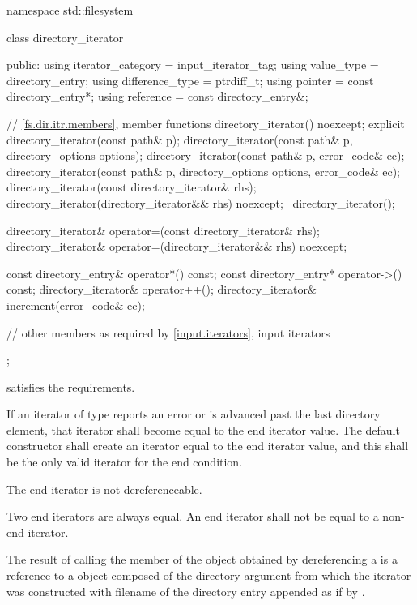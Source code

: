 \begin{codeblock}
namespace std::filesystem {
  class directory_iterator {
  public:
    using iterator_category = input_iterator_tag;
    using value_type        = directory_entry;
    using difference_type   = ptrdiff_t;
    using pointer           = const directory_entry*;
    using reference         = const directory_entry&;

    // \ref{fs.dir.itr.members}, member functions
    directory_iterator() noexcept;
    explicit directory_iterator(const path& p);
    directory_iterator(const path& p, directory_options options);
    directory_iterator(const path& p, error_code& ec);
    directory_iterator(const path& p, directory_options options,
                       error_code& ec);
    directory_iterator(const directory_iterator& rhs);
    directory_iterator(directory_iterator&& rhs) noexcept;
    ~directory_iterator();

    directory_iterator& operator=(const directory_iterator& rhs);
    directory_iterator& operator=(directory_iterator&& rhs) noexcept;

    const directory_entry& operator*() const;
    const directory_entry* operator->() const;
    directory_iterator&    operator++();
    directory_iterator&    increment(error_code& ec);

    // other members as required by \ref{input.iterators}, input iterators
  };
}
\end{codeblock}

\pnum
  satisfies the
  requirements.

\pnum
If an iterator of type  reports an error or
is advanced past the last directory element,
that iterator shall become equal to the end iterator
value. The  default constructor shall
create an iterator equal to the end iterator value, and this shall be the only
valid iterator for the end condition.

\pnum
The end iterator is not dereferenceable.

\pnum
Two end iterators are always equal. An end iterator shall not be equal to a non-end
iterator.

\pnum
The result of calling the  member of the  object obtained by dereferencing a  is a reference to a  object composed of the directory argument from which the iterator was
constructed with filename of the directory entry appended as if by .


